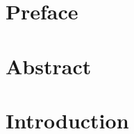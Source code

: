 \documentclass[
10pt, %
a4paper, %
oneside, %
headinclude,footinclude, %
BCOR5mm, %
]{scrartcl}
\begin{document}
\newpage
\section*{Preface} %




\newpage
\setcounter{tocdepth}{2} %
\tableofcontents %

\listoffigures %

\listoftables %

\newpage
\section*{Abstract} %

\lipsum[1] %



\newpage %


\section{Introduction}
\end{document}
